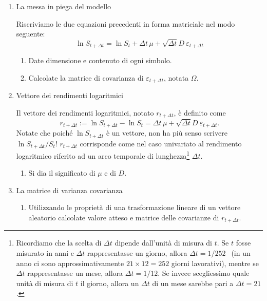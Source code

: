 \documentclass[a4paper,12pt]{article}
\begin{document}
\begin{enumerate}
\item La messa in piega del modello

Riscriviamo le due equazioni precedenti in forma matriciale nel modo
seguente: 
\begin{equation}
\ln S_{t+\Delta t}=\ln S_{t}+\Delta t\,\mu +\sqrt{\Delta t}D\ \varepsilon
_{t+\Delta t}  \label{eq3}
\end{equation}

\begin{enumerate}
\item Date dimensione e contenuto di ogni simbolo.

\item Calcolate la matrice di covarianza di $\varepsilon _{t+\Delta t}$,
notata $\Omega $.
\end{enumerate}

\item Vettore dei rendimenti logaritmici

Il vettore dei rendimenti logaritmici, notato $r_{t+\Delta t}$, \`{e}
definito come 
\begin{equation}
r_{t+\Delta t}:=\ln S_{t+\Delta t}-\ln S_{t}=\Delta t\,\mu +\sqrt{\Delta t}%
D\ \varepsilon _{t+\Delta t}.  \label{eq4}
\end{equation}%
Notate che poich\'{e} $\ln S_{t+\Delta t}$ \`{e} un vettore, non ha pi\`{u}
senso scrivere $\ln S_{t+\Delta t}/S_{t}$! $r_{t+\Delta t}$ corrisponde come
nel caso univariato al rendimento logaritmico riferito ad un arco temporale
di lunghezza\footnote{%
Ricordiamo che la scelta di $\Delta t$ dipende dall'unit\`{a} di misura di $t
$. Se $t$ fosse misurato in anni e $\Delta t$ rappresentasse un giorno,
allora $\Delta t=1/252\;$\ (in un anno ci sono approssimativamente $21\times
12=252$ giorni lavorativi), mentre se $\Delta t$ rappresentasse un mese,
allora $\Delta t=1/12$. Se invece scegliessimo quale unit\`{a} di misura di $%
t$ il giorno, allora un $\Delta t$ di un mese sarebbe pari a $\Delta t=21$.} 
$\Delta t$.

\begin{enumerate}
\item Si dia il significato di $\mu $ e di $D$.
\end{enumerate}

\item La matrice di varianza covarianza

\begin{enumerate}
\item Utilizzando le propriet\`{a} di una trasformazione lineare di un
vettore aleatorio calcolate valore atteso e matrice delle covarianze di $%
r_{t+\Delta t}$.


\end{enumerate}
\end{enumerate}
\end{document}
